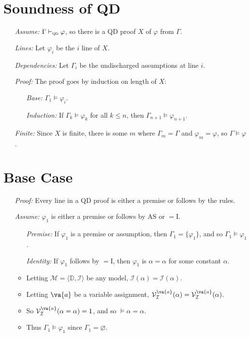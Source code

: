 \documentclass[a4paper, 11pt]{article} %
\newcommand{\tuple}[1]{\langle#1\rangle} %
\newcommand{\set}[1]{\lbrace#1\rbrace} %
\newcommand{\I}{\mathcal{I}}
\newcommand{\M}{\mathcal{M}}
\newcommand{\D}{\mathbb{D}}
\newcommand{\VV}[2]{\mathcal{V}_{#1}^{#2}} %
\begin{document}
\section*{Soundness of QD}

\begin{enumerate}
  \item[\it Assume:] $\Gamma \vdash_{\textsc{qd}} \varphi$, so there is a QD proof $X$ of $\varphi$ from $\Gamma$. 
  \item[\it Lines:] Let $\varphi_i$ be the $i$ line of $X$.
  \item[\it Dependencies:] Let $\Gamma_i$ be the undischarged assumptions at line $i$. 
  \item[\it Proof:] The proof goes by induction on length of $X$:
    \begin{itemize}
      \item[\it Base:] $\Gamma_1 \vDash \varphi_i$. 
      \item[\it Induction:] If $\Gamma_k \vDash \varphi_k$ for all $k\leq n$, then $\Gamma_{n+1} \vDash \varphi_{n+1}$. 
    \end{itemize}
  \item[\it Finite:] Since $X$ is finite, there is some $m$ where $\Gamma_m=\Gamma$ and $\varphi_m=\varphi$, so $\Gamma \vDash \varphi$.
\end{enumerate}




\section*{Base Case}

\begin{enumerate}
  \item[\it Proof:] Every line in a QD proof is either a premise or follows by the rules.
  \item[\it Assume:] $\varphi_1$ is either a premise or follows by AS or $=$I. 
    \begin{itemize}
      \item[\it Premise:] If $\varphi_1$ is a premise or assumption, then $\Gamma_1=\set{\varphi_1}$, and so $\Gamma_1\vDash\varphi_1$.
      \item[\it Identity:] If $\varphi_1$ follows by $=$I, then $\varphi_1$ is $\alpha=\alpha$ for some constant $\alpha$. 
      \item Letting $\M=\tuple{\D,\I}$ be any model, $\I(\alpha)=\I(\alpha)$.
      \item Letting $\va{a}$ be a variable assignment, $\VV{\I}{\va{a}}(\alpha)=\VV{\I}{\va{a}}(\alpha)$.
      \item So $\VV{\I}{\va{a}}(\alpha=\alpha)=1$, and so $\vDash \alpha=\alpha$.
      \item Thus $\Gamma_1\vDash \varphi_1$ since $\Gamma_1=\varnothing$.
    \end{itemize}

\end{enumerate}
\end{document}
